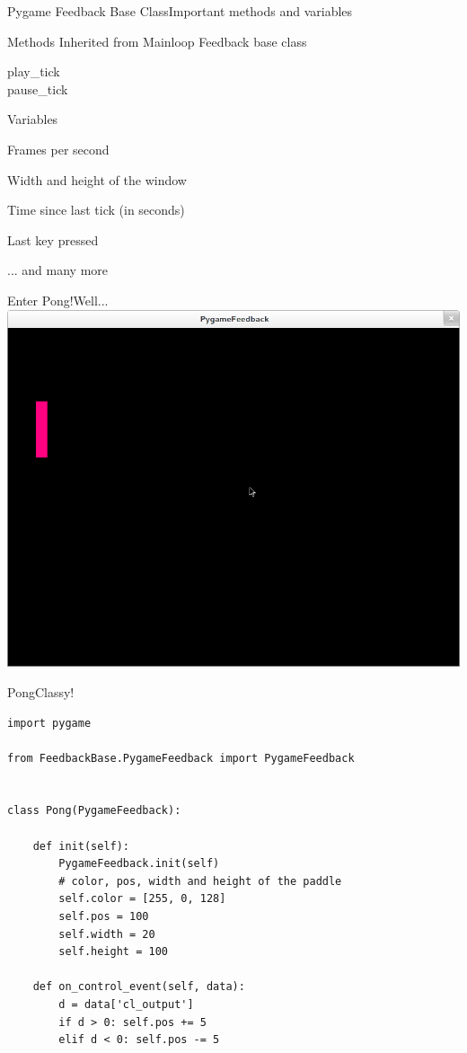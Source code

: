 \documentclass{beamer}
\begin{document}
\begin{frame}{Pygame Feedback Base Class}{Important methods and variables}
    \begin{block}{Methods}
        Inherited from Mainloop Feedback base class
        \begin{description}
            \item[play\_tick]
            \item[pause\_tick]
        \end{description}
    \end{block}
    \pause
    \begin{block}{Variables}
        \begin{description}[xxxxxxxxxxxxxx]
            \item[FPS] Frames per second
            \item[screenSize] Width and height of the window
            \item[elapsed] Time since last tick (in seconds)
            \item[lastkey\_unicode] Last key pressed
        \end{description}
        ... and many more
    \end{block}
\end{frame}


\begin{frame}{Enter Pong!}{Well...}
    \includegraphics[width=0.9\linewidth]{pong}
\end{frame}

\begin{frame}[fragile]{Pong}{Classy!}
    \begin{lstlisting}[tiny]
import pygame

from FeedbackBase.PygameFeedback import PygameFeedback


class Pong(PygameFeedback):

    def init(self):
        PygameFeedback.init(self)
        # color, pos, width and height of the paddle
        self.color = [255, 0, 128]
        self.pos = 100
        self.width = 20
        self.height = 100

    def on_control_event(self, data):
        d = data['cl_output']
        if d > 0: self.pos += 5
        elif d < 0: self.pos -= 5
    \end{lstlisting}
\end{frame}
\end{document}

